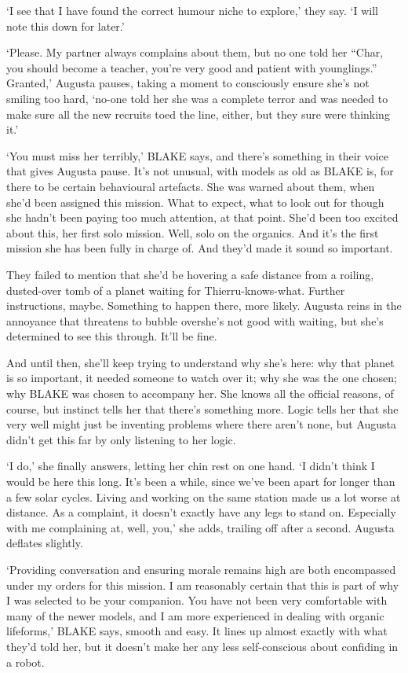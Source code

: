 `I see that I have found the correct humour niche to explore,' they
say. `I will note this down for later.'

`Please. My partner always complains about them, but no one told her
``Char, you should become a teacher, you're very good and patient with
younglings.'' Granted,' Augusta pauses, taking a moment to consciously
ensure she's not smiling too hard, `no-one told her she was a complete
terror and was needed to make sure all the new recruits toed the line,
either, but they sure were thinking it.'

`You must miss her terribly,' BLAKE says, and there's something in
their voice that gives Augusta pause. It's not unusual, with models as
old as BLAKE is, for there to be certain behavioural artefacts. She
was warned about them, when she'd been assigned this mission. What to
expect, what to look out for \textellipsis though she hadn't been
paying too much attention, at that point. She'd been too excited about
this, her first solo mission. Well, solo on the organics. And it's the
first mission she has been fully in charge of. And they'd made it
sound so important.

They failed to mention that she'd be hovering a safe distance from a
roiling, dusted-over tomb of a planet waiting for
Thierru-knows-what. Further instructions, maybe. Something to happen
there, more likely. Augusta reins in the annoyance that threatens to
bubble over\textemdash she's not good with waiting, but she's
determined to see this through. It'll be fine.

And until then, she'll keep trying to understand why she's here: why
that planet is so important, it needed someone to watch over it; why
she was the one chosen; why BLAKE was chosen to accompany her. She
knows all the official reasons, of course, but instinct tells her that
there's something more.  Logic tells her that she very well might just
be inventing problems where there aren't none, but Augusta didn't get
this far by only listening to her logic.

`I do,' she finally answers, letting her chin rest on one hand. `I
didn't think I would be here this long. It's been a while, since we've
been apart for longer than a few solar cycles. Living and working on
the same station made us a lot worse at distance. As a complaint, it
doesn't exactly have any legs to stand on. Especially with me
complaining at, well, you,' she adds, trailing off after a
second. Augusta deflates slightly.

`Providing conversation and ensuring morale remains high are both
encompassed under my orders for this mission. I am reasonably certain
that this is part of why I was selected to be your companion. You have
not been very comfortable with many of the newer models, and I am more
experienced in dealing with organic lifeforms,' BLAKE says, smooth and
easy. It lines up almost exactly with what they'd told her, but it
doesn't make her any less self-conscious about confiding in a robot.

